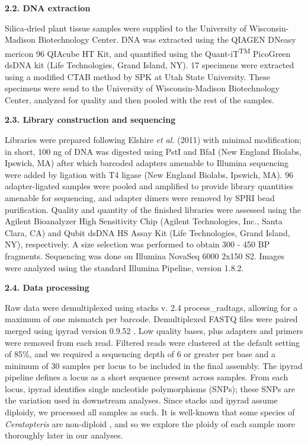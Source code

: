 \documentclass[12pt]{article}
\begin{document}
\begin{flushleft}
\textbf{2.2. DNA extraction}

Silica-dried plant tissue samples were supplied to the University of Wisconsin-Madison Biotechnology Center. DNA was extracted using the QIAGEN DNeasy mericon 96 QIAcube HT Kit, and quantified using the Quant-iT\textsuperscript{TM} PicoGreen\textsuperscript{\textregistered} dsDNA kit (Life Technologies, Grand Island, NY). 17 specimens were extracted using a modified CTAB method \autocite{Doyle1987} by SPK at Utah State University. These specimens were send to the University of Wisconsin-Madison Biotechnology Center, analyzed for quality and then pooled with the rest of the samples.

\textbf{2.3. Library construction and sequencing}

Libraries were prepared following Elshire \textit{et al.} (2011)\nocite{Elshire2011} with minimal modification; in short, 100 ng of DNA was digested using PstI and BfaI (New England Biolabs, Ipswich, MA) after which barcoded adapters amenable to Illumina sequencing were added by ligation with T4 ligase (New England Biolabs, Ipswich, MA). 96 adapter-ligated samples were pooled and amplified to provide library quantities amenable for sequencing, and adapter dimers were removed by SPRI bead purification. Quality and quantity of the finished libraries were assessed using the Agilent Bioanalyzer High Sensitivity Chip (Agilent Technologies, Inc., Santa Clara, CA) and Qubit\textsuperscript{\textregistered} dsDNA HS Assay Kit (Life Technologies, Grand Island, NY), respectively. A size selection was performed to obtain 300 - 450 BP fragments. Sequencing was done on Illumina NovaSeq 6000 2x150 S2. Images were analyzed using the standard Illumina Pipeline, version 1.8.2. 

\textbf{2.4. Data processing}

Raw data were demultiplexed using stacks v. 2.4 \autocite{Catchen2011, Catchen2013} process\_radtags, allowing for a maximum of one mismatch per barcode. Demultiplexed FASTQ files were paired merged using ipyrad version 0.9.52 \autocite{Eaton2020}. Low quality bases, plus adapters and primers were removed from each read. Filtered reads were clustered at the default setting of 85\%, and we required a sequencing depth of 6 or greater per base and a minimum of 30 samples per locus to be included in the final assembly. The ipyrad pipeline defines a locus as a short sequence present across samples. From each locus, ipyrad identifies single nucleotide polymorphisms (SNPs); these SNPs are the variation used in downstream analyses. Since stacks and ipyrad assume diploidy, we processed all samples as such. It is well-known that some species of \textit{Ceratopteris} are non-diploid \autocite{Adjie2007, Masuyama2010}, and so we explore the ploidy of each sample more thoroughly later in our analyses.


\end{flushleft}
\end{document}
